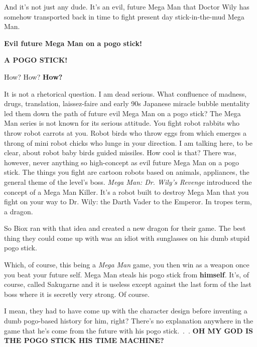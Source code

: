 \documentclass{book}
\let\oldcenter\center
\let\oldendcenter\endcenter
\renewenvironment{center}{\setlength\topsep{0pt}\oldcenter}{\oldendcenter}
\begin{document}
And it’s not just any dude. It’s an evil, future Mega Man that Doctor Wily has somehow transported back in time to fight present day stick-in-the-mud Mega Man.

\textbf{Evil future Mega Man on a pogo stick!}

\textbf{A POGO STICK!}

How? How? \textbf{How?}

It is not a rhetorical question. I am dead serious. What confluence of madness, drugs, translation, laissez-faire and early 90s Japanese miracle bubble mentality led them down the path of future evil Mega Man on a pogo stick? The Mega Man series is not known for its serious attitude. You fight robot rabbits who throw robot carrots at you. Robot birds who throw eggs from which emerges a throng of mini robot chicks who lunge in your direction. I am talking here, to be clear, about robot baby birds guided missiles. How cool is that? There was, however, never anything so high-concept as evil future Mega Man on a pogo stick. The things you fight are cartoon robots based on animals, appliances, the general theme of the level’s boss. \emph{Mega Man: Dr. Wily’s Revenge} introduced the concept of a Mega Man Killer. It’s a robot built to destroy Mega Man that you fight on your way to Dr. Wily: the Darth Vader to the Emperor. In tropes term, a dragon.

So Biox ran with that idea and created a new dragon for their game. The best thing they could come up with was an idiot with sunglasses on his dumb stupid pogo stick.

Which, of course, this being a \emph{Mega Man} game, you then win as a weapon once you beat your future self. Mega Man steals his pogo stick from \textbf{himself}. It’s, of course, called Sakugarne and it is useless except against the last form of the last boss where it is secretly very strong. Of course.

I mean, they had to have come up with the character design before inventing a dumb pogo-based history for him, right? There’s no explanation anywhere in the game that he’s come from the future with his pogo stick. . . \textbf{OH MY GOD IS THE POGO STICK HIS TIME MACHINE?}

\begin{center}
\vspace{8pt}
\quad\vspace{4pt}
\quad\vspace{4pt}
\end{center}
\end{document}
